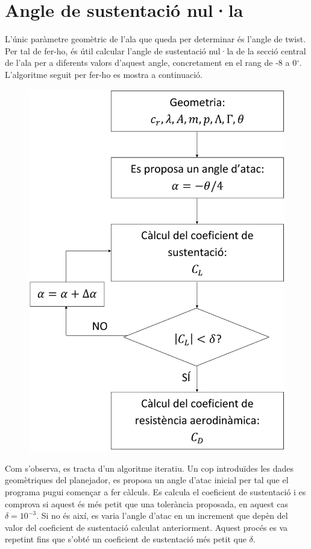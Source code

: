 \section{Angle de sustentació nul·la}
L'únic paràmetre geomètric de l'ala que queda per determinar és l'angle de twist. Per tal de fer-ho, és útil calcular l'angle de sustentació nul·la de la secció central de l'ala per a diferents valors d'aquest angle, concretament en el rang de -8 a 0$^{\circ}$. L'algoritme seguit per fer-ho es mostra a continuació.
\begin{figure}[H]
	\centering
	\includegraphics[scale=0.1]{./plots/algoritmeZLangle}
\end{figure}

Com s'observa, es tracta d'un algoritme iteratiu. Un cop introduïdes les dades geomètriques del planejador, es proposa un angle d'atac inicial per tal que el programa pugui començar a fer càlculs. Es calcula el coeficient de sustentació i es comprova si aquest és més petit que una tolerància proposada, en aquest cas $\delta=10^{-3}$. Si no és així, es varia l'angle d'atac en un increment que depèn del valor del coeficient de sustentació calculat anteriorment. Aquest procés es va repetint fins que s'obté un coeficient de sustentació més petit que $\delta$.

